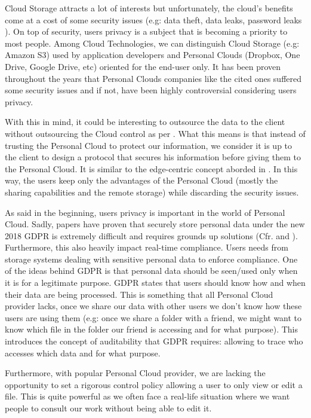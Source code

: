 \documentclass[../main.tex]{subfiles}
\begin{document}
\par Cloud Storage attracts a lot of interests but unfortunately, the cloud's benefits come at a cost of some security issues (e.g: data theft, data leaks, password leaks \cite{wiki:dropboxcritisism}). On top of security, users privacy is a subject that is becoming a priority to most people. Among Cloud Technologies, we can distinguish Cloud Storage (e.g: Amazon S3) used by application developers and Personal Clouds (Dropbox, One Drive, Google Drive, etc) oriented for the end-user only. It has been proven throughout the years that Personal Clouds companies like the cited ones suffered some security issues and if not, have been highly controversial considering users privacy.
\par With this in mind, it could be interesting to outsource the data to the client without outsourcing the Cloud control as per \cite{10.1145/1655008.1655020}. What this means is that instead of trusting the Personal Cloud to protect our information, we consider it is up to the client to design a protocol that secures his information before giving them to the Personal Cloud. It is similar to the edge-centric concept aborded in \cite{10.1145/2831347.2831354}. In this way, the users keep only the advantages of the Personal Cloud (mostly the sharing capabilities and the remote storage) while discarding the security issues.
\par As said in the beginning, users privacy is important in the world of Personal Cloud. Sadly, papers have proven that securely store personal data under the new 2018 GDPR is extremely difficult and requires grounds up solutions (Cfr. \cite{234843} and \cite{234729}). Furthermore, this also heavily impact real-time compliance. Users needs from storage systems dealing with sensitive personal data to enforce compliance. One of the ideas behind GDPR is that personal data should be seen/used only when it is for a legitimate purpose. GDPR states that users should know how and when their data are being processed. This is something that all Personal Cloud provider lacks, once we share our data with other users we don't know how these users are using them (e.g: once we share a folder with a friend, we might want to know which file in the folder our friend is accessing and for what purpose).  This introduces the concept of auditability that GDPR requires: allowing to trace who accesses which data and for what purpose.
\par Furthermore, with popular Personal Cloud provider, we are lacking the opportunity to set a rigorous control policy allowing a user to only view or edit a file. This is quite powerful as we often face a real-life situation where we want people to consult our work without being able to edit it.
\end{document}
